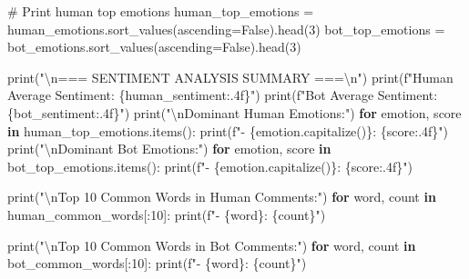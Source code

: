 \documentclass[
  12pt,
  letterpaper,
  DIV=11,
  numbers=noendperiod]{scrartcl}
\newenvironment{Shaded}{\begin{snugshade}}{\end{snugshade}}
\newcommand{\BuiltInTok}[1]{\textcolor[rgb]{0.00,0.23,0.31}{#1}}
\newcommand{\CharTok}[1]{\textcolor[rgb]{0.13,0.47,0.30}{#1}}
\newcommand{\CommentTok}[1]{\textcolor[rgb]{0.37,0.37,0.37}{#1}}
\newcommand{\ControlFlowTok}[1]{\textcolor[rgb]{0.00,0.23,0.31}{\textbf{#1}}}
\newcommand{\DecValTok}[1]{\textcolor[rgb]{0.68,0.00,0.00}{#1}}
\newcommand{\KeywordTok}[1]{\textcolor[rgb]{0.00,0.23,0.31}{\textbf{#1}}}
\newcommand{\NormalTok}[1]{\textcolor[rgb]{0.00,0.23,0.31}{#1}}
\newcommand{\OperatorTok}[1]{\textcolor[rgb]{0.37,0.37,0.37}{#1}}
\newcommand{\SpecialCharTok}[1]{\textcolor[rgb]{0.37,0.37,0.37}{#1}}
\newcommand{\SpecialStringTok}[1]{\textcolor[rgb]{0.13,0.47,0.30}{#1}}
\newcommand{\StringTok}[1]{\textcolor[rgb]{0.13,0.47,0.30}{#1}}
\newcommand{\VariableTok}[1]{\textcolor[rgb]{0.07,0.07,0.07}{#1}}
\begin{document}
\begin{Shaded}
\begin{Highlighting}[]
\CommentTok{\# Print human top emotions}
\NormalTok{human\_top\_emotions }\OperatorTok{=}\NormalTok{ human\_emotions.sort\_values(ascending}\OperatorTok{=}\VariableTok{False}\NormalTok{).head(}\DecValTok{3}\NormalTok{)}
\NormalTok{bot\_top\_emotions }\OperatorTok{=}\NormalTok{ bot\_emotions.sort\_values(ascending}\OperatorTok{=}\VariableTok{False}\NormalTok{).head(}\DecValTok{3}\NormalTok{)}

\BuiltInTok{print}\NormalTok{(}\StringTok{"}\CharTok{\textbackslash{}n}\StringTok{=== SENTIMENT ANALYSIS SUMMARY ===}\CharTok{\textbackslash{}n}\StringTok{"}\NormalTok{)}
\BuiltInTok{print}\NormalTok{(}\SpecialStringTok{f"Human Average Sentiment: }\SpecialCharTok{\{}\NormalTok{human\_sentiment}\SpecialCharTok{:.4f\}}\SpecialStringTok{"}\NormalTok{)}
\BuiltInTok{print}\NormalTok{(}\SpecialStringTok{f"Bot Average Sentiment: }\SpecialCharTok{\{}\NormalTok{bot\_sentiment}\SpecialCharTok{:.4f\}}\SpecialStringTok{"}\NormalTok{)}
\BuiltInTok{print}\NormalTok{(}\StringTok{"}\CharTok{\textbackslash{}n}\StringTok{Dominant Human Emotions:"}\NormalTok{)}
\ControlFlowTok{for}\NormalTok{ emotion, score }\KeywordTok{in}\NormalTok{ human\_top\_emotions.items():}
    \BuiltInTok{print}\NormalTok{(}\SpecialStringTok{f"{-} }\SpecialCharTok{\{}\NormalTok{emotion}\SpecialCharTok{.}\NormalTok{capitalize()}\SpecialCharTok{\}}\SpecialStringTok{: }\SpecialCharTok{\{}\NormalTok{score}\SpecialCharTok{:.4f\}}\SpecialStringTok{"}\NormalTok{)}
\BuiltInTok{print}\NormalTok{(}\StringTok{"}\CharTok{\textbackslash{}n}\StringTok{Dominant Bot Emotions:"}\NormalTok{)}
\ControlFlowTok{for}\NormalTok{ emotion, score }\KeywordTok{in}\NormalTok{ bot\_top\_emotions.items():}
    \BuiltInTok{print}\NormalTok{(}\SpecialStringTok{f"{-} }\SpecialCharTok{\{}\NormalTok{emotion}\SpecialCharTok{.}\NormalTok{capitalize()}\SpecialCharTok{\}}\SpecialStringTok{: }\SpecialCharTok{\{}\NormalTok{score}\SpecialCharTok{:.4f\}}\SpecialStringTok{"}\NormalTok{)}

\BuiltInTok{print}\NormalTok{(}\StringTok{"}\CharTok{\textbackslash{}n}\StringTok{Top 10 Common Words in Human Comments:"}\NormalTok{)}
\ControlFlowTok{for}\NormalTok{ word, count }\KeywordTok{in}\NormalTok{ human\_common\_words[:}\DecValTok{10}\NormalTok{]:}
    \BuiltInTok{print}\NormalTok{(}\SpecialStringTok{f"{-} }\SpecialCharTok{\{}\NormalTok{word}\SpecialCharTok{\}}\SpecialStringTok{: }\SpecialCharTok{\{}\NormalTok{count}\SpecialCharTok{\}}\SpecialStringTok{"}\NormalTok{)}

\BuiltInTok{print}\NormalTok{(}\StringTok{"}\CharTok{\textbackslash{}n}\StringTok{Top 10 Common Words in Bot Comments:"}\NormalTok{)}
\ControlFlowTok{for}\NormalTok{ word, count }\KeywordTok{in}\NormalTok{ bot\_common\_words[:}\DecValTok{10}\NormalTok{]:}
    \BuiltInTok{print}\NormalTok{(}\SpecialStringTok{f"{-} }\SpecialCharTok{\{}\NormalTok{word}\SpecialCharTok{\}}\SpecialStringTok{: }\SpecialCharTok{\{}\NormalTok{count}\SpecialCharTok{\}}\SpecialStringTok{"}\NormalTok{)}


\end{Highlighting}
\end{Shaded}
\end{document}
